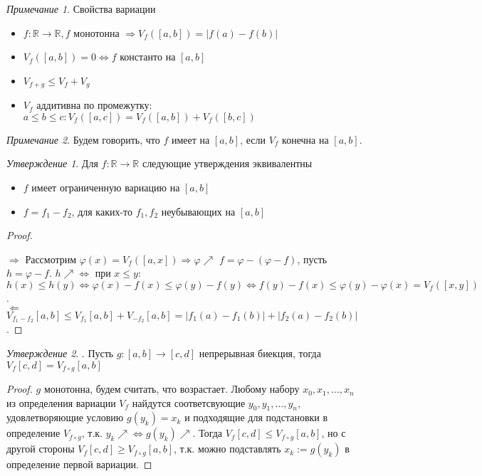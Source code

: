 \documentclass[a4paper]{article}
\theoremstyle{indented}
\theoremstyle{definition}
\theoremstyle{remark}
\newtheorem{remark}{Примечание}
\newtheorem{stat}{Утверждение}
\DeclareMathOperator{\La}{\Leftarrow}
\DeclareMathOperator{\Ra}{\Rightarrow}
\begin{document}
\begin{remark}
    Свойства вариации
    \begin{itemize}
        \item $f: \mathbb{R}\to\mathbb{R}, f$ монотонна $\Rightarrow V_f([a,b])=|f(a)-f(b)|$
        \item $V_f([a,b])=0 \Leftrightarrow f$ константо на $[a,b]$
        \item $V_{f+g} \leq V_f + V_g$
        \item $V_f$ аддитивна по промежутку: \\ $a\leq b\leq c: V_f([a,c])=V_f([a,b])+V_f([b,c])$
    \end{itemize}
\end{remark}

\begin{remark}
    Будем говорить, что $f$ имеет  на $[a,b]$, если $V_f$ конечна на $[a,b]$. 
\end{remark}

\begin{stat}
    Для $f: \mathbb{R}\to\mathbb{R}$ следующие утверждения эквивалентны
    \begin{itemize}
        \item $f$ имеет ограниченную вариацию на $[a,b]$
        \item $f=f_1-f_2$, для каких-то  $f_1, f_2$ неубывающих на $[a,b]$
    \end{itemize}
\end{stat}

\begin{proof} \ 

    $\Ra$ Рассмотрим $\varphi(x) = V_f([a,x]) \Rightarrow \varphi \nearrow$ 
    $f = \varphi - (\varphi-f)$, пусть $h=\varphi-f$. $h\nearrow \Leftrightarrow$ при $x\leq y$: $h(x)\leq h(y) \Leftrightarrow \varphi(x)-f(x) \leq \varphi(y)-f(y) \Leftrightarrow f(y)-f(x) \leq \varphi(y) - \varphi(x) = V_f([x,y])$. \\

    $\La$ $V_{f_1-f_2}[a,b] \leq V_{f_1}[a,b] + V_{-f_2}[a,b] = |f_1(a)-f_1(b)|+|f_2(a)-f_2(b)|$.
\end{proof}

\begin{stat}
    . 
    Пусть $g: [a,b] \to [c,d]$ непрерывная биекция, тогда $V_f[c,d]=V_{f\circ g}[a,b]$
\end{stat}

\begin{proof}
    $g$ монотонна, будем считать, что возрастает. Любому набору $x_0, x_1, \dots, x_n$ из определения вариации $V_f$ найдутся соответсвующие  $y_0, y_1, \dots, y_n$,
    удовлетворяющие условию $g(y_k)=x_k$ и подходящие для подстановки в определение $V_{f\circ g}$, т.к. $y_k \nearrow \Leftrightarrow g(y_k) \nearrow$. Тогда $V_f[c,d]\leq V_{f\circ g}[a,b]$,
    но с другой стороны $V_f[c,d]\geq V_{f\circ g}[a,b]$, т.к. можно подставлять $x_k:=g(y_k)$ в определение первой вариации.
\end{proof}
\end{document}
